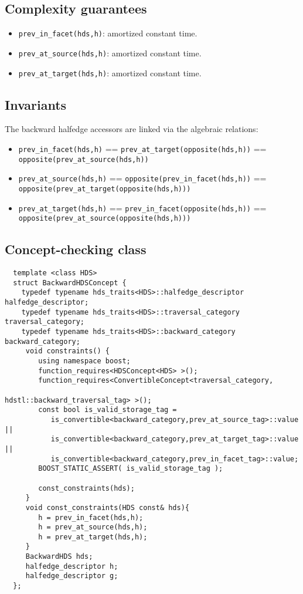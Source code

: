 \subsection{Complexity guarantees}\label{backwardhds_refbackwardhds8}
\begin{itemize}
\item {\tt prev\_\-in\_\-facet(hds,h)}: amortized constant time.\item {\tt prev\_\-at\_\-source(hds,h)}: amortized constant time.\item {\tt prev\_\-at\_\-target(hds,h)}: amortized constant time.\end{itemize}
\subsection{Invariants}\label{backwardhds_refbackwardhds9}
The backward halfedge accessors are linked via the algebraic relations:\begin{itemize}
\item {\tt prev\_\-in\_\-facet(hds,h)} == {\tt prev\_\-at\_\-target(opposite(hds,h))} == {\tt opposite(prev\_\-at\_\-source(hds,h))}\item {\tt prev\_\-at\_\-source(hds,h)} == {\tt opposite(prev\_\-in\_\-facet(hds,h))} == {\tt opposite(prev\_\-at\_\-target(opposite(hds,h)))}\item {\tt prev\_\-at\_\-target(hds,h)} == {\tt prev\_\-in\_\-facet(opposite(hds,h))} == {\tt opposite(prev\_\-at\_\-source(opposite(hds,h)))}\end{itemize}
\subsection{Concept-checking class}\label{backwardhds_refbackwardhds10}


\begin{Code}\begin{verbatim}  template <class HDS> 
  struct BackwardHDSConcept {
    typedef typename hds_traits<HDS>::halfedge_descriptor halfedge_descriptor; 
    typedef typename hds_traits<HDS>::traversal_category traversal_category;
    typedef typename hds_traits<HDS>::backward_category backward_category;
     void constraints() {
        using namespace boost;
        function_requires<HDSConcept<HDS> >();
        function_requires<ConvertibleConcept<traversal_category,
                                         hdstl::backward_traversal_tag> >();  
        const bool is_valid_storage_tag =
           is_convertible<backward_category,prev_at_source_tag>::value ||
           is_convertible<backward_category,prev_at_target_tag>::value ||
           is_convertible<backward_category,prev_in_facet_tag>::value;
        BOOST_STATIC_ASSERT( is_valid_storage_tag ); 
 
        const_constraints(hds);
     }
     void const_constraints(HDS const& hds){
        h = prev_in_facet(hds,h);
        h = prev_at_source(hds,h);
        h = prev_at_target(hds,h);
     }
     BackwardHDS hds;
     halfedge_descriptor h;
     halfedge_descriptor g;
  };
\end{verbatim}\end{Code}

 